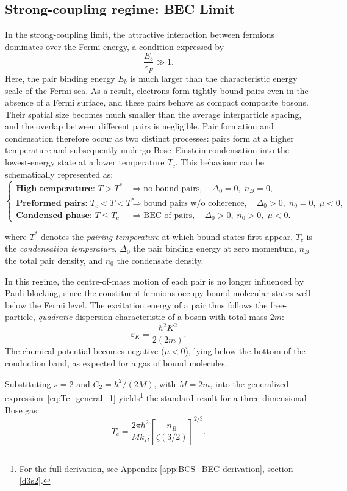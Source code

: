 \subsection*{Strong-coupling regime: BEC Limit}
In the strong-coupling limit, the attractive interaction between fermions dominates over the Fermi energy, a condition expressed by
\[
\frac{E_b}{\varepsilon_F} \gg 1.
\]
Here, the pair binding energy \(E_b\) is much larger than the characteristic energy scale of the Fermi sea.  
As a result, electrons form tightly bound pairs even in the absence of a Fermi surface, and these pairs behave as compact composite bosons.  
Their spatial size becomes much smaller than the average interparticle spacing, and the overlap between different pairs is negligible.  
Pair formation and condensation therefore occur as two distinct processes: pairs form at a higher temperature and subsequently undergo Bose--Einstein condensation into the lowest-energy state at a lower temperature \(T_c\).  
This behaviour can be schematically represented as:
\[
\begin{cases}
\textbf{High temperature: } T > T^{\ast} &
\Rightarrow \text{no bound pairs},\quad \Delta_0 = 0,\; n_B = 0, \\[6pt]
\textbf{Preformed pairs: } T_c < T < T^{\ast} &
\Rightarrow \text{bound pairs w/o coherence},\quad \Delta_0 > 0,\; n_0 = 0,\; \mu < 0, \\[6pt]
\textbf{Condensed phase: } T \leq T_c &
\Rightarrow \text{BEC of pairs},\quad \Delta_0 > 0,\; n_0 > 0,\; \mu < 0.
\end{cases}
\]

where \(T^{\ast}\) denotes the \textit{pairing temperature} at which bound states first appear, 
\(T_c\) is the \textit{condensation temperature}, 
\(\Delta_0\) the pair binding energy at zero momentum, 
\(n_B\) the total pair density, and \(n_0\) the condensate density.

In this regime, the centre-of-mass motion of each pair is no longer influenced by Pauli blocking, since the constituent fermions occupy bound molecular states well below the Fermi level.  
The excitation energy of a pair thus follows the free-particle, \textit{quadratic} dispersion characteristic of a boson with total mass \(2m\):
\[
    \varepsilon_K = \frac{\hbar^2 K^2}{2(2m)}.
    \label{eq:quadratic_dispersion}
\]
The chemical potential becomes negative (\(\mu < 0\)), lying below the bottom of the conduction band, as expected for a gas of bound molecules. 

Substituting \(s = 2\) and \(C_2 = \hbar^2 / (2M)\), with $M = 2m$, into the generalized expression~\eqref{eq:Tc_general_1} yields\footnote{%
For the full derivation, see Appendix \ref{app:BCS_BEC-derivation}, section \ref{d3s2}.
} the standard result for a three-dimensional Bose gas:
\begin{equation}
    T_c = \frac{2\pi \hbar^2}{M k_B}
          \left[\frac{n_B}{\zeta(3/2)}\right]^{2/3}.
    \label{eq:Tc_strong_coupling}
\end{equation}

